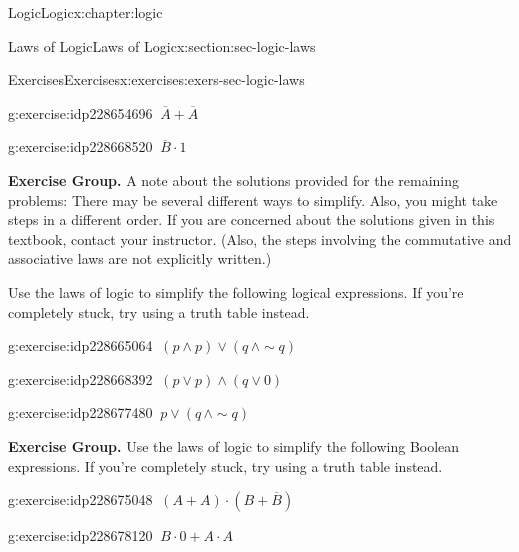 \documentclass[twoside,10pt,]{book}
\numberwithin{equation}{section}
\begin{document}
\begin{chapterptx}{Logic}{}{Logic}{}{}{x:chapter:logic}
\begin{sectionptx}{Laws of Logic}{}{Laws of Logic}{}{}{x:section:sec-logic-laws}
\begin{exercises-subsection}{Exercises}{}{Exercises}{}{}{x:exercises:exers-sec-logic-laws}
\begin{exercisegroup}
\begin{divisionexerciseeg}{16}{}{}{g:exercise:idp228654696}%
\(\ \overline{A}+\overline{A}\)\end{divisionexerciseeg}%
\begin{divisionexerciseeg}{17}{}{}{g:exercise:idp228668520}%
\(\ \overline{B}\cdot 1\)\end{divisionexerciseeg}%
\end{exercisegroup}
\par\medskip\noindent
\par\medskip\noindent%
\textbf{Exercise Group.}\space\space%
A note about the solutions provided for the remaining problems: There may be several different ways to simplify.  Also, you might take steps in a different order.  If you are concerned about the solutions given in this textbook, contact your instructor.  (Also, the steps involving the commutative and associative laws are not explicitly written.)%
\par
Use the laws of logic to simplify the following logical expressions.  If you're completely stuck, try using a truth table instead.%
\begin{exercisegroup}
\begin{divisionexerciseeg}{18}{}{}{g:exercise:idp228665064}%
\(\ (p{\wedge} p){\vee}(q\,{\wedge}\sim\!{q})\)\end{divisionexerciseeg}%
\begin{divisionexerciseeg}{19}{}{}{g:exercise:idp228668392}%
\(\ (p{\vee} p){\wedge} (q{\vee} 0)\)\end{divisionexerciseeg}%
\begin{divisionexerciseeg}{20}{}{}{g:exercise:idp228677480}%
\(\ p{\vee}(q\,{\wedge}\sim\!{q})\)\end{divisionexerciseeg}%
\end{exercisegroup}
\par\medskip\noindent
\par\medskip\noindent%
\textbf{Exercise Group.}\space\space%
Use the laws of logic to simplify the following Boolean expressions.  If you're completely stuck, try using a truth table instead.\begin{exercisegroup}
\begin{divisionexerciseeg}{21}{}{}{g:exercise:idp228675048}%
\(\ (A+A)\cdot(B+\overline{B})\)\end{divisionexerciseeg}%
\begin{divisionexerciseeg}{22}{}{}{g:exercise:idp228678120}%
\(\ B\cdot 0+A\cdot A\)\end{divisionexerciseeg}%

\end{exercisegroup}
\end{exercises-subsection}
\end{sectionptx}
\end{chapterptx}
\end{document}
